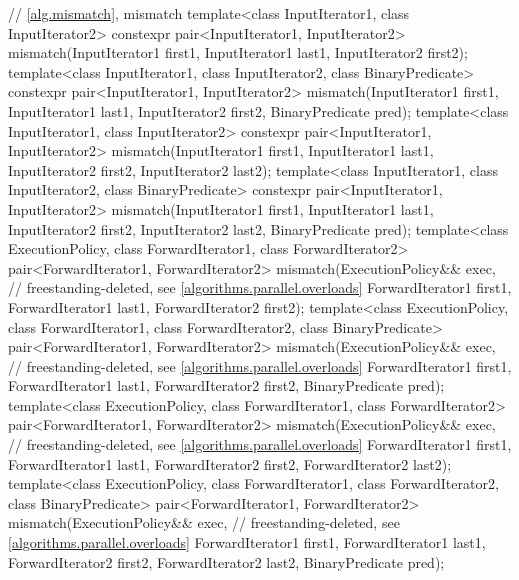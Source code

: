 \begin{codeblock}
{  // \ref{alg.mismatch}, mismatch
  template<class InputIterator1, class InputIterator2>
    constexpr pair<InputIterator1, InputIterator2>
      mismatch(InputIterator1 first1, InputIterator1 last1,
               InputIterator2 first2);
  template<class InputIterator1, class InputIterator2, class BinaryPredicate>
    constexpr pair<InputIterator1, InputIterator2>
      mismatch(InputIterator1 first1, InputIterator1 last1,
               InputIterator2 first2, BinaryPredicate pred);
  template<class InputIterator1, class InputIterator2>
    constexpr pair<InputIterator1, InputIterator2>
      mismatch(InputIterator1 first1, InputIterator1 last1,
               InputIterator2 first2, InputIterator2 last2);
  template<class InputIterator1, class InputIterator2, class BinaryPredicate>
    constexpr pair<InputIterator1, InputIterator2>
      mismatch(InputIterator1 first1, InputIterator1 last1,
               InputIterator2 first2, InputIterator2 last2,
               BinaryPredicate pred);
  template<class ExecutionPolicy, class ForwardIterator1, class ForwardIterator2>
    pair<ForwardIterator1, ForwardIterator2>
      mismatch(ExecutionPolicy&& exec,                          // freestanding-deleted, see \ref{algorithms.parallel.overloads}
               ForwardIterator1 first1, ForwardIterator1 last1,
               ForwardIterator2 first2);
  template<class ExecutionPolicy, class ForwardIterator1, class ForwardIterator2,
           class BinaryPredicate>
    pair<ForwardIterator1, ForwardIterator2>
      mismatch(ExecutionPolicy&& exec,                          // freestanding-deleted, see \ref{algorithms.parallel.overloads}
               ForwardIterator1 first1, ForwardIterator1 last1,
               ForwardIterator2 first2, BinaryPredicate pred);
  template<class ExecutionPolicy, class ForwardIterator1, class ForwardIterator2>
    pair<ForwardIterator1, ForwardIterator2>
      mismatch(ExecutionPolicy&& exec,                          // freestanding-deleted, see \ref{algorithms.parallel.overloads}
               ForwardIterator1 first1, ForwardIterator1 last1,
               ForwardIterator2 first2, ForwardIterator2 last2);
  template<class ExecutionPolicy, class ForwardIterator1, class ForwardIterator2,
           class BinaryPredicate>
    pair<ForwardIterator1, ForwardIterator2>
      mismatch(ExecutionPolicy&& exec,                          // freestanding-deleted, see \ref{algorithms.parallel.overloads}
               ForwardIterator1 first1, ForwardIterator1 last1,
               ForwardIterator2 first2, ForwardIterator2 last2,
               BinaryPredicate pred);

}
\end{codeblock}
